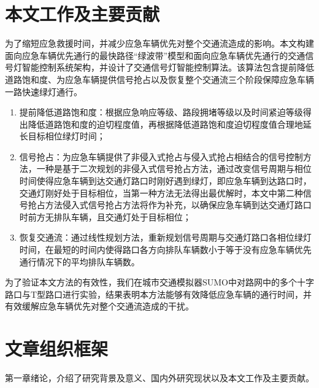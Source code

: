 \section{本文工作及主要贡献}
为了缩短应急救援时间，并减少应急车辆优先对整个交通流造成的影响。本文构建面向应急车辆优先通行的最快路径“绿波带”模型和面向应急车辆优先通行的交通信号灯智能控制系统架构，并设计了交通信号灯智能控制算法。该算法包含提前降低道路饱和度、为应急车辆提供信号抢占以及恢复整个交通流三个阶段保障应急车辆一路快速绿灯通行。

\begin{enumerate}
	\item 提前降低道路饱和度：根据应急响应等级、路段拥堵等级以及时间紧迫等级得出降低道路饱和度的迫切程度值，再根据降低道路饱和度迫切程度值合理地延长目标相位绿灯时间；
	
	\item 信号抢占：为应急车辆提供了非侵入式抢占与侵入式抢占相结合的信号控制方法，一种是基于二次规划的非侵入式信号抢占方法，通过改变信号周期与相位时间使得应急车辆到达交通灯路口时刚好遇到绿灯，即应急车辆到达路口时，交通灯刚好处于目标相位，当第一种方法无法得出最优解时，本文中第二种信号抢占方法侵入式信号抢占方法将作为补充，以确保应急车辆到达交通灯路口时前方无排队车辆，且交通灯处于目标相位；
	\item 恢复交通流：通过线性规划方法，重新规划信号周期与交通灯路口各相位绿灯时间，在最短的时间内使得路口各方向排队车辆数小于等于没有应急车辆优先通行情况下的平均排队车辆数。
\end{enumerate}

为了验证本文方法的有效性，我们在城市交通模拟器SUMO\cite{behrisch2011sumo}中对路网中的多个十字路口与T型路口进行实验，结果表明本方法能够有效降低应急车辆的通行时间，并有效缓解应急车辆优先对整个交通流造成的干扰。


\section{文章组织框架}
第一章绪论，介绍了研究背景及意义、国内外研究现状以及本文工作及主要贡献。

